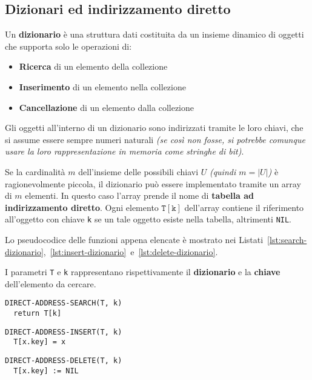 \documentclass[italian, 10pt]{article}
\begin{document}
\subsection{Dizionari ed indirizzamento diretto}

Un \textbf{dizionario} è una struttura dati costituita da un insieme dinamico di oggetti che supporta solo le operazioni di:

\begin{itemize}
  \item \textbf{Ricerca} di un elemento della collezione
  \item \textbf{Inserimento} di un elemento nella collezione
  \item \textbf{Cancellazione} di un elemento dalla collezione
\end{itemize}

Gli oggetti all'interno di un dizionario sono indirizzati tramite le loro chiavi, che si assume essere sempre numeri naturali \textit{(se così non fosse, si potrebbe comunque usare la loro rappresentazione in memoria come stringhe di bit)}.

Se la cardinalità \(m\) dell'insieme delle possibili chiavi \(U\) \textit{(quindi \(m = |U|\))} è ragionevolmente piccola, il dizionario può essere implementato tramite un array di \(m\) elementi.
In questo caso l'array prende il nome di \textbf{tabella ad indirizzamento diretto}.
Ogni elemento \(\texttt{T}[\texttt{k}]\) dell'array contiene il riferimento all'oggetto con chiave \texttt{k} se un tale oggetto esiste nella tabella, altrimenti \texttt{NIL}.

\bigskip
Lo pseudocodice delle funzioni appena elencate è mostrato nei Listati~\ref{lst:search-dizionario},~\ref{lst:insert-dizionario}~e~\ref{lst:delete-dizionario}.

I parametri \texttt{T} e \texttt{k} rappresentano rispettivamente il \textbf{dizionario} e la \textbf{chiave} dell'elemento da cercare.

\begin{lstlisting}[numbers=none, style=pseudocode, caption={Ricerca}, label={lst:search-dizionario}]
DIRECT-ADDRESS-SEARCH(T, k)
  return T[k]
\end{lstlisting}

\begin{lstlisting}[style=pseudocode, caption={Inserzione}, label={lst:insert-dizionario}]
DIRECT-ADDRESS-INSERT(T, k)
  T[x.key] = x
\end{lstlisting}

\begin{lstlisting}[numbers=none, style=pseudocode, caption={Cancellazione}, label={lst:delete-dizionario}]
DIRECT-ADDRESS-DELETE(T, k)
  T[x.key] := NIL
\end{lstlisting}
\end{document}
